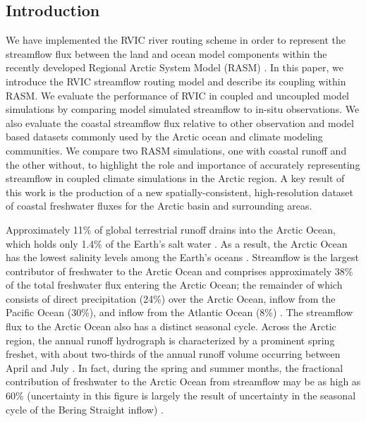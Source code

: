 \documentclass[jgrga, draft]{agutex}
\begin{document}
%

\begin{article}

%
%

\section{Introduction}
\label{sec:intro}
We have implemented the RVIC river routing scheme in order to represent the streamflow flux between the land and ocean model components within the recently developed Regional Arctic System Model (RASM) \citep{Roberts_2015a,Hamman_2016}.
In this paper, we introduce the RVIC streamflow routing model and describe its coupling within RASM.
We evaluate the performance of RVIC in coupled and uncoupled model simulations by comparing model simulated streamflow to in-situ observations.
We also evaluate the coastal streamflow flux relative to other observation and model based datasets commonly used by the Arctic ocean and climate modeling communities.
We compare two RASM simulations, one with coastal runoff and the other without, to highlight the role and importance of accurately representing streamflow in coupled climate simulations in the Arctic region.
A key result of this work is the production of a new spatially-consistent, high-resolution dataset of coastal freshwater fluxes for the Arctic basin and surrounding areas.

Approximately 11\% of global terrestrial runoff drains into the Arctic Ocean, which holds only 1.4\% of the Earth's salt water \citep{Lewis_2000,Lammers_2001}.
As a result, the Arctic Ocean has the lowest salinity levels among the Earth's oceans \citep{Steele_2001}.
Streamflow is the largest contributor of freshwater to the Arctic Ocean and comprises approximately 38\% of the total freshwater flux entering the Arctic Ocean; the remainder of which consists of direct precipitation (24\%) over the Arctic Ocean, inflow from the Pacific Ocean (30\%), and inflow from the Atlantic Ocean (8\%) \citep{Serreze_2006}.
The streamflow flux to the Arctic Ocean also has a distinct seasonal cycle.
Across the Arctic region, the annual runoff hydrograph is characterized by a prominent spring freshet, with about two-thirds of the annual runoff volume occurring between April and July \citep{Lammers_2001}.
In fact, during the spring and summer months, the fractional contribution of freshwater to the Arctic Ocean from streamflow may be as high as 60\% (uncertainty in this figure is largely the result of uncertainty in the seasonal cycle of the Bering Straight inflow) \citep{Serreze_2006}.


\end{article}
\end{document}
